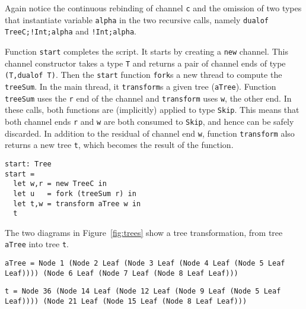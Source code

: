 Again notice the continuous rebinding of channel \lstinline|c| and the
omission of two types that instantiate variable \lstinline|alpha| in
the two recursive calls, namely \lstinline|dualof TreeC;!Int;alpha|
and \lstinline|!Int;alpha|.

Function \lstinline|start| completes the script. It starts by creating
a \lstinline|new| channel. This channel constructor takes a type
\lstinline|T| and returns a pair of channel ends of type
%
\lstinline|(T,dualof T)|. Then the \lstinline|start| function
\lstinline|fork|s a new thread to compute the \lstinline|treeSum|. In
the main thread, it \lstinline|transform|s a given tree
(\lstinline|aTree|). Function \lstinline|treeSum| uses the
\lstinline|r| end of the channel and \lstinline|transform| uses
\lstinline|w|, the other end. In these calls, both functions are
(implicitly) applied to type \lstinline|Skip|. This means that both
channel ends \lstinline|r| and \lstinline|w| are both consumed to
\lstinline|Skip|, and hence can be safely discarded. In addition to
the residual of channel end \lstinline|w|, function
\lstinline|transform| also returns a new tree \lstinline|t|, which
becomes the result of the function.
%
\begin{lstlisting}
start: Tree
start =
  let w,r = new TreeC in
  let u   = fork (treeSum r) in
  let t,w = transform aTree w in
  t
\end{lstlisting}

The two diagrams in Figure~\ref{fig:trees} show a tree transformation, from tree
\lstinline|aTree| into tree \lstinline|t|.

\begin{lstlisting}
aTree = Node 1 (Node 2 Leaf (Node 3 Leaf (Node 4 Leaf (Node 5 Leaf Leaf)))) (Node 6 Leaf (Node 7 Leaf (Node 8 Leaf Leaf)))
\end{lstlisting}

\begin{lstlisting}
t = Node 36 (Node 14 Leaf (Node 12 Leaf (Node 9 Leaf (Node 5 Leaf Leaf)))) (Node 21 Leaf (Node 15 Leaf (Node 8 Leaf Leaf)))
\end{lstlisting}

